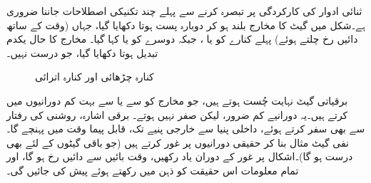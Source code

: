 ثنائی ادوار  کی کارکردگی پر تبصرہ کرنے  سے پہلے  چند تکنیکی اصطلاحات جاننا ضروری ہے۔شکل    میں  گیٹ کا مخارج  بلند ہو کر دوبارہ پست ہوتا دکھایا گیا، جہاں (وقت  کے ساتھ دائیں رخ چلتے ہوئے)  پہلے  کنارے کو     یا    ،  جبکہ دوسرے کو    یا  کہا گیا۔ مخارج کا  حال یکدم تبدیل ہوتا دکھایا گیا،  جو  درست نہیں۔
\begin{figure}
\centering
{}
\caption{کنارہ چڑھائی اور کنارہ اترائی}
\label{شکل_ترتیبی_کنارے}
\end{figure}

برقیاتی گیٹ  نہایت چُست ہوتے ہیں، جو   مخارج کو  سے   یا   سے     بہت کم دورانیوں   میں  کرتے ہیں۔یہ دورانیے  کم ضرور،  لیکن صفر   نہیں ہوتے۔ برقی اشارہ،     روشنی کی رفتار سے بھی  سفر کرتے   ہوئے،  داخلی پنیا سے خارجی پنیے  تک، قابل پیما  وقت میں پہنچے گا۔ نفی گیٹ  مثال بنا کر حقیقی  دورانیوں پر غور کرتے ہیں (جو باقی  گیٹوں کے لئے  بھی درست  ہو گا)۔اشکال پر غور کے دوران یاد رکھیں،  وقت بائیں سے دائیں رخ ہو گا، اور تمام معلومات اس حقیقت کو ذہن میں رکھتے ہوئے پیش کی جائیں گی۔

